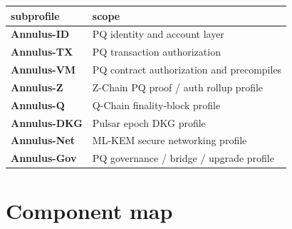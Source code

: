 \documentclass[11pt,a4paper]{article}
\newcommand{\PQ}{\textsf{PQ}}
\begin{document}
\begin{center}\small
\begin{tabular}{l l}
\toprule
subprofile & scope \\
\midrule
\textbf{Annulus-ID}  & \PQ{} identity and account layer \\
\textbf{Annulus-TX}  & \PQ{} transaction authorization \\
\textbf{Annulus-VM}  & \PQ{} contract authorization and precompiles \\
\textbf{Annulus-Z}   & Z-Chain \PQ{} proof / auth rollup profile \\
\textbf{Annulus-Q}   & Q-Chain finality-block profile \\
\textbf{Annulus-DKG} & Pulsar epoch DKG profile \\
\textbf{Annulus-Net} & ML-KEM secure networking profile \\
\textbf{Annulus-Gov} & \PQ{} governance / bridge / upgrade profile \\
\bottomrule
\end{tabular}
\end{center}

\section{Component map}
\label{sec:components}
\end{document}
